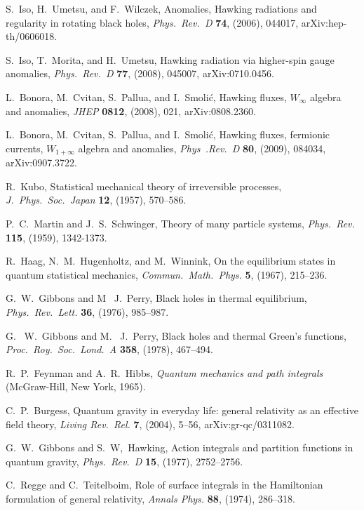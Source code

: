 \documentclass[12pt]{article}
\begin{document}
\begin{thebibliography}{999}
 S.\ Iso, H.\ Umetsu, and F.\ Wilczek, Anomalies, 
Hawking radiations and regularity in rotating black holes,
\emph{Phys.\ Rev.\ D} {\bf 74}, (2006), 044017, arXiv:hep-th/0606018.

 S.\ Iso, T.\ Morita, and H.\ Umetsu, Hawking radiation 
via higher-spin gauge anomalies, \emph{Phys.\ Rev.\ D} {\bf 77}, 
(2008), 045007, arXiv:0710.0456. 

 L.\ Bonora, M.\ Cvitan, S.\ Pallua, and I.\ Smoli{\'c},
Hawking fluxes, $W_\infty$ algebra and anomalies, \emph{JHEP} 
{\bf 0812}, (2008), 021, arXiv:0808.2360.

 L.\ Bonora, M.\ Cvitan, S.\ Pallua, and I.\ Smoli{\'c},
Hawking fluxes, fermionic currents, $W_{1+\infty}$ algebra and 
anomalies, \emph{Phys\ .Rev.\ D} {\bf 80}, (2009), 084034,
arXiv:0907.3722.

 R.\ Kubo, Statistical mechanical theory of irreversible 
processes, \emph{J.\ Phys.\ Soc.\ Japan} {\bf 12}, (1957), 570--586.

 P.~C.\ Martin and J.~S.\ Schwinger, Theory of 
many particle systems, \emph{Phys.\ Rev.} {\bf 115}, (1959),
1342-1373.

 R.\ Haag,  N.~M.\ Hugenholtz, and M.\ Winnink,
On the equilibrium states in quantum statistical mechanics,
\emph{Commun.\ Math.\ Phys.} {\bf 5}, (1967), 215--236.

  G.~W.\ Gibbons and M~ J.\ Perry, Black holes in 
thermal equilibrium, \emph{Phys.\ Rev.\ Lett.} {\bf 36}, (1976),
985--987.

 G.~ W.\ Gibbons and M.~ J.\ Perry, Black holes 
and thermal Green's functions, \emph{Proc.\ Roy.\ Soc.\
Lond.\ A} {\bf 358}, (1978), 467--494.

  R.~P.\ Feynman and A.~R.\ Hibbs, \emph{Quantum
mechanics and path integrals} (McGraw-Hill, New York, 1965).

 C.~P.\ Burgess, Quantum gravity in everyday life: 
general relativity as an effective field theory, \emph{Living Rev.\ Rel.}
{\bf 7}, (2004), 5--56, arXiv:gr-qc/0311082.

 G.~W.\ Gibbons and S.~W,\ Hawking, Action 
integrals and partition functions in quantum gravity,
\emph{Phys.\ Rev.\ D} {\bf 15}, (1977), 2752--2756.

 C.\ Regge and C.\ Teitelboim, Role of surface 
integrals in the Hamiltonian formulation of general relativity,
\emph{Annals Phys.} {\bf 88}, (1974), 286--318.


\end{thebibliography}
\end{document}
